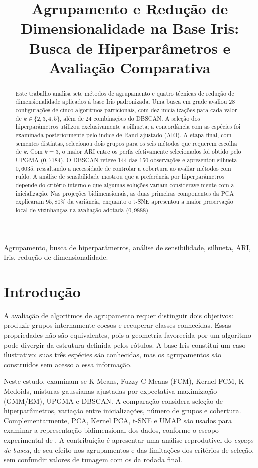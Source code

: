 \documentclass[conference,a4paper]{IEEEtran}
\title{Agrupamento e Redução de Dimensionalidade na Base Iris: Busca de Hiperparâmetros e Avaliação Comparativa}
\author{
\IEEEauthorblockN{Fátima Araújo\IEEEauthorrefmark{1}, Rodrigo Gomes\IEEEauthorrefmark{2}}
\IEEEauthorblockA{Centro de Informática -- Universidade Federal de Pernambuco, Recife, Brasil\\
\IEEEauthorrefmark{1}frqal@cin.ufpe.br \quad \IEEEauthorrefmark{2}rgar@cin.ufpe.br}
}
\begin{document}
\maketitle
\begin{abstract}
Este trabalho analisa sete métodos de agrupamento e quatro técnicas de redução de dimensionalidade aplicados à base Iris padronizada. Uma busca em grade avaliou 28 configurações de cinco algoritmos particionais, com dez inicializações para cada valor de $k\in\{2,3,4,5\}$, além de 24 combinações do DBSCAN. A seleção dos hiperparâmetros utilizou exclusivamente a silhueta; a concordância com as espécies foi examinada posteriormente pelo índice de Rand ajustado (ARI). A etapa final, com sementes distintas, selecionou dois grupos para os seis métodos que requerem escolha de $k$. Com $k=3$, o maior ARI entre os perfis efetivamente selecionados foi obtido pelo UPGMA ($0{,}7184$). O DBSCAN reteve 144 das 150 observações e apresentou silhueta $0{,}6035$, ressaltando a necessidade de controlar a cobertura ao avaliar métodos com ruído. A análise de sensibilidade mostrou que a preferência por hiperparâmetros depende do critério interno e que algumas soluções variam consideravelmente com a inicialização. Nas projeções bidimensionais, as duas primeiras componentes da PCA explicaram $95{,}80\%$ da variância, enquanto o t-SNE apresentou a maior preservação local de vizinhanças na avaliação adotada ($0{,}9888$).
\end{abstract}
\begin{IEEEkeywords}
Agrupamento, busca de hiperparâmetros, análise de sensibilidade, silhueta, ARI, Iris, redução de dimensionalidade.
\end{IEEEkeywords}

\section{Introdução}
A avaliação de algoritmos de agrupamento requer distinguir dois objetivos: produzir grupos internamente coesos e recuperar classes conhecidas. Essas propriedades não são equivalentes, pois a geometria favorecida por um algoritmo pode divergir da estrutura definida pelos rótulos. A base Iris constitui um caso ilustrativo: suas três espécies são conhecidas, mas os agrupamentos são construídos sem acesso a essa informação.

Neste estudo, examinam-se K-Means, Fuzzy C-Means (FCM), Kernel FCM, K-Medoids, misturas gaussianas ajustadas por expectativa-maximização (GMM/EM), UPGMA e DBSCAN. A comparação considera seleção de hiperparâmetros, variação entre inicializações, número de grupos e cobertura. Complementarmente, PCA, Kernel PCA, t-SNE e UMAP são usados para examinar a representação bidimensional dos dados, conforme o escopo experimental de \cite{enunciado}. A contribuição é apresentar uma análise reprodutível do \emph{espaço de busca}, de seu efeito nos agrupamentos e das limitações dos critérios de seleção, sem confundir valores de tunagem com os da rodada final.
\end{document}
